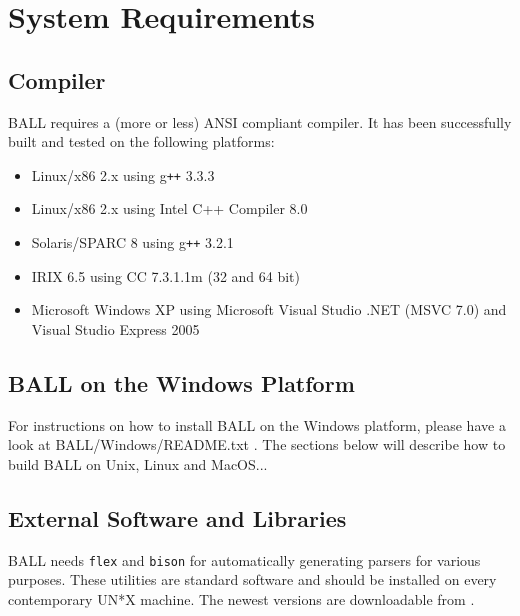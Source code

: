 \section{System Requirements}
\label{requirements}

\subsection{Compiler}
  BALL requires a (more or less) ANSI compliant \CPP compiler.
  It has been successfully built and tested on the following platforms:
	\begin{itemize}	
   	\item Linux/x86 2.x using g{\tt ++} 3.3.3
   	\item Linux/x86 2.x using Intel C++ Compiler 8.0
   	\item Solaris/SPARC 8 using g{\tt ++} 3.2.1
   	\item IRIX 6.5 using CC 7.3.1.1m (32 and 64 bit)
		\item Microsoft Windows XP using Microsoft Visual Studio .NET (MSVC 7.0) and Visual Studio Express 2005
 	\end{itemize}

\subsection{BALL on the Windows Platform}

For instructions on how to install BALL on the Windows platform, please
have a look at BALL/Windows/README.txt . The sections below will describe
how to build BALL on Unix, Linux and MacOS...

\subsection{External Software and Libraries}

BALL needs {\tt flex} and {\tt bison} for automatically generating parsers
for various purposes. These utilities are standard software and should be
installed on every contemporary UN*X machine. The newest versions are
downloadable from .

